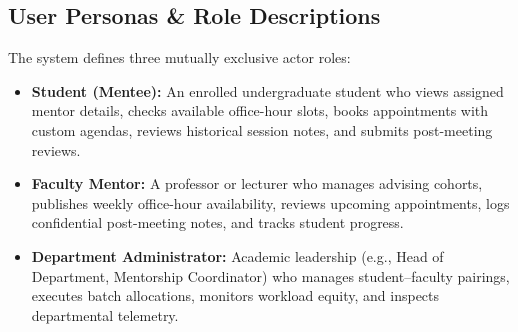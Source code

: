 \documentclass[11pt,a4paper]{article}
\begin{document}
\subsection{User Personas \& Role Descriptions}
The system defines three mutually exclusive actor roles:
\begin{itemize}[leftmargin=1.4em, itemsep=0.2em]
  \item \textbf{Student (Mentee):} An enrolled undergraduate student who views assigned mentor details, checks available office-hour slots, books appointments with custom agendas, reviews historical session notes, and submits post-meeting reviews.
  \item \textbf{Faculty Mentor:} A professor or lecturer who manages advising cohorts, publishes weekly office-hour availability, reviews upcoming appointments, logs confidential post-meeting notes, and tracks student progress.
  \item \textbf{Department Administrator:} Academic leadership (e.g., Head of Department, Mentorship Coordinator) who manages student--faculty pairings, executes batch allocations, monitors workload equity, and inspects departmental telemetry.
\end{itemize}
\end{document}
